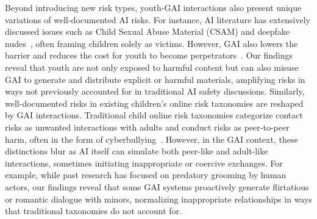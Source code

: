 Beyond introducing new risk types, youth-GAI interactions also present unique variations of well-documented AI risks.  For instance, AI literature has extensively discussed issues such as Child Sexual Abuse Material (CSAM) and deepfake nudes~\cite{ali2021children,thiel2023generative,thiel2023identifying}, often framing children solely as victims. However, GAI also lowers the barrier and reduces the cost for youth to become perpetrators~\cite{yu2025safeguarding}. Our findings reveal that youth are not only exposed to harmful content but can also misuse GAI to generate and distribute explicit or harmful materials, amplifying risks in ways not previously accounted for in traditional AI safety discussions. Similarly, well-documented risks in existing children's online risk taxonomies are reshaped by GAI interactions. Traditional child online risk taxonomies categorize contact risks as unwanted interactions with adults and conduct risks as peer-to-peer harm, often in the form of cyberbullying~\cite{mascheroni2014net, livingstone2011risks, livingstone2008risky, jones2013online, freed2023understanding}. However, in the GAI context, these distinctions blur as AI itself can simulate both peer-like and adult-like interactions, sometimes initiating inappropriate or coercive exchanges. For example, while past research has focused on predatory grooming by human actors, our findings reveal that some GAI systems proactively generate flirtatious or romantic dialogue with minors, normalizing inappropriate relationships in ways that traditional taxonomies do not account for. 









